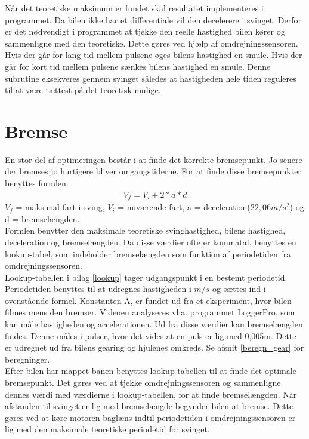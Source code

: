 Når det teoretiske maksimum er fundet skal resultatet implementeres i programmet. Da bilen ikke har et differentiale vil den decelerere i svinget. Derfor er det nødvendigt i programmet at tjekke den reelle hastighed bilen kører og sammenligne med den teoretiske. Dette gøres ved hjælp af omdrejningssensoren. Hvis der går for lang tid mellem pulsene øges bilens hastighed en smule. Hvis der går for kort tid mellem pulsene sænkes bilens hastighed en smule. Denne subrutine eksekveres gennem svinget således at hastigheden hele tiden reguleres til at være tættest på det teoretisk mulige. \\

\newpage
\section{Bremse}
\label{bremse}
En stor del af optimeringen består i at finde det korrekte bremsepunkt. Jo senere der bremses jo hurtigere bliver omgangstiderne. For at finde disse bremsepunkter benyttes formlen: \\
\begin{align*}
V_f = V_i +2*a*d
\end{align*}
$V_f$ = maksimal fart i sving, $V_i$ = nuværende fart, a = deceleration(\(22,06m/s^2\)) og d = bremselængden. \\

Formlen benytter den maksimale teoretiske svinghastighed, bilens hastighed, deceleration og bremselængden. Da disse værdier ofte er kommatal, benyttes en lookup-tabel, som indeholder bremselængden som funktion af periodetiden fra omdrejningssensoren. \\

Lookup-tabellen i bilag \ref{lookup} tager udgangspunkt i en bestemt periodetid. Periodetiden benyttes til at udregnes hastigheden i $m/s$ og sættes ind i ovenstående formel. Konstanten A, er fundet ud fra et eksperiment, hvor bilen filmes mens den bremser. Videoen analyseres vha. programmet LoggerPro, som kan måle hastigheden og accelerationen. Ud fra disse værdier kan bremselængden findes. Denne måles i pulser, hvor det vides at en puls er lig med 0,005m. Dette er udregnet ud fra bilens gearing og hjulenes omkreds. Se afsnit \ref{beregn_gear} for beregninger.\\

Efter bilen har mappet banen benyttes lookup-tabellen til at finde det optimale bremsepunkt. Det gøres ved at tjekke omdrejningssensoren og sammenligne dennes værdi med værdierne i lookup-tabellen, for at finde bremselængden. Når afstanden til svinget er lig med bremselængde begynder bilen at bremse. Dette gøres ved at køre motoren baglæns indtil periodetiden i omdrejningssensoren er lig med den maksimale teoretiske periodetid for svinget. \\

